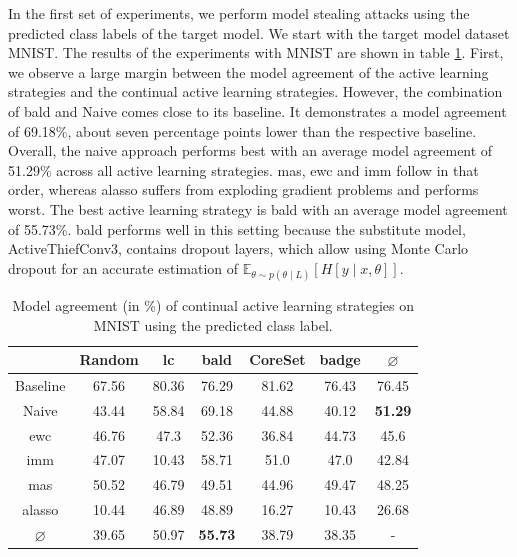 In the first set of experiments, we perform model stealing attacks using the predicted class labels of the target model. We start with the target model dataset MNIST. 
The results of the experiments with MNIST are shown in table \ref{fig:ModelStealingMNISTLabel}. First, we observe a large margin between the model agreement
of the active learning strategies and the continual active learning strategies. However, the combination of \gls{bald} and Naive comes close to
its baseline. It demonstrates a model agreement of 69.18\%, about seven percentage points lower than the respective baseline. Overall, the naive approach performs
best with an average model agreement of 51.29\% across all active learning strategies. \gls{mas}, \gls{ewc} and \gls{imm} follow in that order, whereas \gls{alasso} 
suffers from exploding gradient problems and performs worst. The best active learning strategy is \gls{bald} with an average model agreement of 55.73\%. \gls{bald}
performs well in this setting because the substitute model, ActiveThiefConv3, contains dropout layers, which allow using Monte Carlo dropout for an accurate estimation
of $\mathbb{E}_{\theta \sim p(\theta \mid L)} [H[y \mid x, \theta]]$. \par

\begin{table}[h]
    \centering
    \begin{tabular}{c | c c c c c | c } 
         & Random & \gls{lc} & \gls{bald} & CoreSet & \gls{badge} & $\varnothing$ \\ 
        \hline
        Baseline & 67.56 & 80.36 & 76.29 & 81.62 & 76.43 & 76.45\\
        \hline
        Naive & 43.44 & 58.84 & 69.18 & 44.88 & 40.12 & \textbf{51.29}\\
        \gls{ewc} &  46.76 & 47.3 & 52.36 & 36.84 & 44.73 & 45.6\\
        \gls{imm} & 47.07 & 10.43 & 58.71 & 51.0 & 47.0 & 42.84\\
        \gls{mas} & 50.52 & 46.79 & 49.51 & 44.96 & 49.47 & 48.25\\
        \gls{alasso} & 10.44 & 46.89 & 48.89 & 16.27 & 10.43 & 26.68\\
        \hline
        $\varnothing$ & 39.65 & 50.97 & \textbf{55.73} & 38.79 & 38.35 & -\\
    \end{tabular}
    \caption{Model agreement (in \%) of continual active learning strategies on MNIST using the predicted class label.}
    \label{fig:ModelStealingMNISTLabel}
\end{table}


